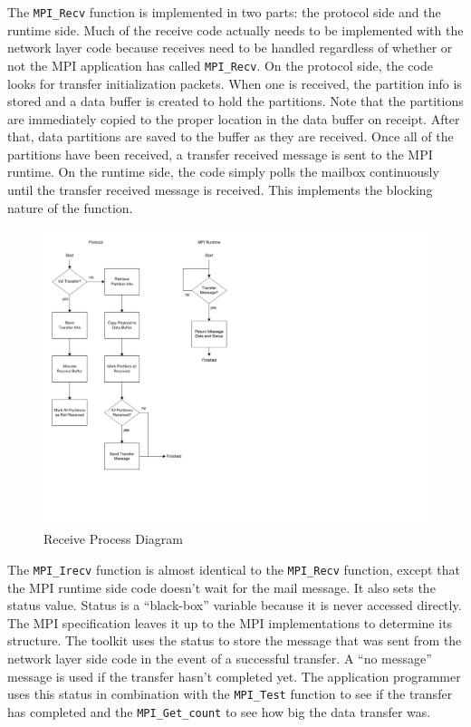 The \lstinline$MPI_Recv$ function is implemented in two parts: the protocol side and the runtime side. Much of the receive code actually needs to be implemented with the network layer code because receives need to be handled regardless of whether or not the MPI application has called \lstinline$MPI_Recv$. On the protocol side, the code looks for transfer initialization packets. When one is received, the partition info is stored and a data buffer is created to hold the partitions. Note that the partitions are immediately copied to the proper location in the data buffer on receipt. After that, data partitions are saved to the buffer as they are received. Once all of the partitions have been received, a transfer received message is sent to the MPI runtime. On the runtime side, the code simply polls the mailbox continuously until the transfer received message is received. This implements the blocking nature of the function.

\begin{figure}[ptb]
	\begin{centering}
		\includegraphics{API/Figures/api-receive_process_diagram.pdf}
		\caption{Receive Process Diagram}
		\label{fig:api:receive_process_diagram}
	\end{centering}
\end{figure}

The \lstinline$MPI_Irecv$ function is almost identical to the \lstinline$MPI_Recv$ function, except that the MPI runtime side code doesn't wait for the mail message. It also sets the status value. Status is a ``black-box'' variable because it is never accessed directly. The MPI specification leaves it up to the MPI implementations to determine its structure. The toolkit uses the status to store the message that was sent from the network layer side code in the event of a successful transfer. A ``no message'' message is used if the transfer hasn't completed yet. The application programmer uses this status in combination with the \lstinline$MPI_Test$ function to see if the transfer has completed and the \lstinline$MPI_Get_count$ to see how big the data transfer was.

